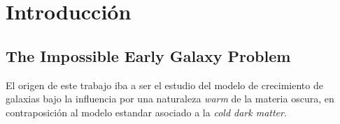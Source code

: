 
\chapter{Introducción} %

\label{introduction} %


\newcommand{\keyword}[1]{\textbf{#1}}
\newcommand{\tabhead}[1]{\textbf{#1}}
\newcommand{\code}[1]{\texttt{#1}}
\newcommand{\file}[1]{\texttt{\bfseries#1}}
\newcommand{\option}[1]{\texttt{\itshape#1}}



\section{The Impossible Early Galaxy Problem}

El origen de este trabajo iba a ser el estudio del modelo de crecimiento de galaxias bajo la influencia por una naturaleza \textit{warm} de la materia oscura, en contraposición al modelo estandar asociado a la \textit{cold dark matter}.